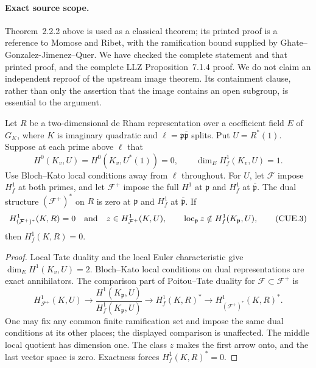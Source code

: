 \paragraph{Exact source scope.}
Theorem~2.2.2 above is used as a classical theorem; its printed
proof is a reference to Momose and Ribet, with the ramification
bound supplied by Ghate--Gonzalez-Jimenez--Quer.  We have checked
the complete statement and that printed proof, and the complete
LLZ Proposition~7.1.4 proof.  We do not claim an independent
reproof of the upstream image theorem.  Its containment clause, rather than only the assertion that the image contains an open
subgroup, is essential to the argument.

\begin{proposition}
\label{AC-K29-plus}
Let $R$ be a two-dimensional de Rham representation over a
coefficient field $E$ of $G_K$, where $K$ is imaginary quadratic
and $\ell=\mathfrak p\overline{\mathfrak p}$ splits.
Put $U=R^*(1)$.  Suppose at each prime above $\ell$ that
\[
 H^0(K_v,U)=H^0(K_v,U^*(1))=0,\qquad
 \dim_E H_f^1(K_v,U)=1.                              \tag{CUE.2}
\]
Use Bloch--Kato local conditions away from $\ell$ throughout.
For $U$, let $\mathcal F$ impose $H_f^1$ at both primes, and
let $\mathcal F^+$ impose the full $H^1$ at $\mathfrak p$ and
$H_f^1$ at $\overline{\mathfrak p}$.  The dual structure
$(\mathcal F^+)^*$ on $R$ is zero at $\mathfrak p$ and
$H_f^1$ at $\overline{\mathfrak p}$.
If
\[
 H^1_{(\mathcal F^+)^*}(K,R)=0
 \quad\hbox{and}\quad
 z\in H^1_{\mathcal F^+}(K,U),\qquad
 \operatorname{loc}_{\mathfrak p}z\notin H_f^1(K_{\mathfrak p},U),
                                                        \tag{CUE.3}
\]
then $H_f^1(K,R)=0$.
\end{proposition}
\begin{proof}
Local Tate duality and the local Euler characteristic give
$\dim_EH^1(K_v,U)=2$.  Bloch--Kato local conditions on dual
representations are exact annihilators.  The comparison part of
Poitou--Tate duality for $\mathcal F\subset\mathcal F^+$ is
\[
 H^1_{\mathcal F^+}(K,U)\longrightarrow
 \frac{H^1(K_{\mathfrak p},U)}{H_f^1(K_{\mathfrak p},U)}
 \longrightarrow H_f^1(K,R)^*
 \longrightarrow H^1_{(\mathcal F^+)^*}(K,R)^* .        \tag{CUE.4}
\]
One may fix any common finite ramification set and impose the
same dual conditions at its other places; the displayed comparison
is unaffected.  The middle local quotient has dimension one.
The class $z$ makes the first arrow onto, and the last vector
space is zero.  Exactness forces $H_f^1(K,R)^*=0$.
\end{proof}


